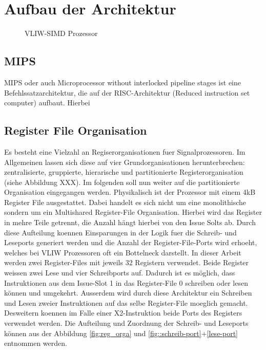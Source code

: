 \section{Aufbau der Architektur}
\label{chap:architecture_overview}


\begin{figure}[htbp] 
	\centering
	
	\caption{VLIW-SIMD Prozessor }
	\label{fig:VLIW_SIMD}
\end{figure}

\subsection{MIPS}
MIPS oder auch \glqq Microprocessor without interlocked pipeline stages\grqq{} ist eine Befehlssatzarchitektur, die auf der RISC-Architektur  (Reduced instruction set computer) aufbaut. Hierbei
\subsection{Register File Organisation}
Es besteht eine Vielzahl an Regiserorganisationen fuer Signalprozessoren. Im Allgemeinen lassen sich diese auf vier Grundorganisationen herunterbrechen: zentralisierte, gruppierte, hierarische und partitionierte Registerorganisation (siehe Abbildung XXX).
Im folgenden soll nun weiter auf die partitionierte Organisation eingegangen werden. Physikalisch ist der Prozessor mit einem 4kB Register File ausgestattet. Dabei handelt es sich nicht um eine monolithische sondern um ein Multishared Register-File Organisation. Hierbei wird das Register in mehre Teile getrennt, die Anzahl hängt hierbei von den Issue Solts ab. Durch diese Aufteilung koennen Einsparungen in der Logik fuer die Schreib- und Leseports generiert werden und die Anzahl der Register-File-Ports wird erhoeht, welches bei VLIW Prozessoren oft ein Bottelneck darstellt. In dieser Arbeit werden zwei Register-Files mit jeweils 32 Registern verwendet. Beide Register weissen zwei Lese und vier Schreibports auf. Dadurch ist es möglich, dass Instruktionen aus dem Issue-Slot 1 in das Register-File 0 schreiben oder lesen können und umgekehrt. Ausserdem wird durch diese Architektur ein Schreiben und Lesen zweier Instruktionen auf das selbe Register-File moeglich gemacht. Desweitern koennen im Falle einer X2-Instruktion beide Ports des Registers verwendet werden. Die Aufteilung und  Zuordnung der Schreib- und Leseports können aus der Abbildung \ref{fig:reg_orga} und \autoref{fig::schreib-port}+\ref{lese-port} entnommen werden.

